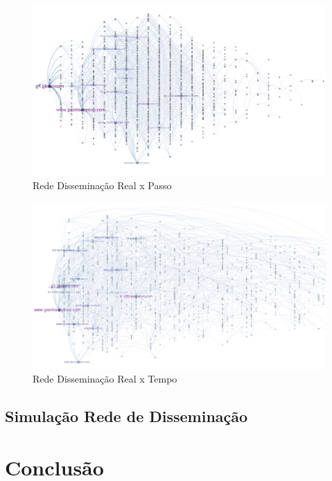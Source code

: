 \documentclass[a4paper,12pt]{article}
\begin{document}
\begin{figure}[h]
 \centering
 \includegraphics[scale=0.4]{../results/a.png}
 \caption{Rede Disseminação Real x Passo}
\end{figure}


\begin{figure}[h]
 \centering
 \includegraphics[scale=0.4]{../results/t.png}
 \caption{Rede Disseminação Real x Tempo}
\end{figure}

\subsection{Simulação Rede de Disseminação}



\section{Conclusão}
\end{document}
